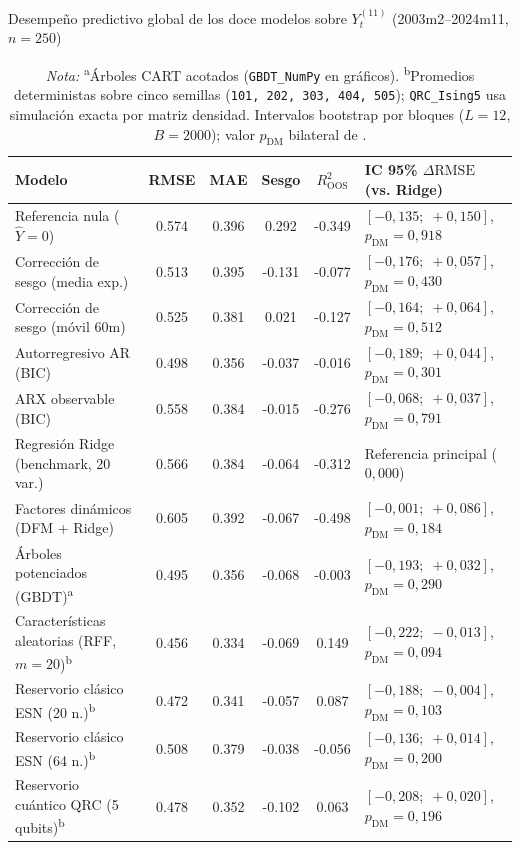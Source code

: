 \begin{table}[htbp]
	\centering
	\caption{Desempeño predictivo global de los doce modelos sobre \(Y_t^{(11)}\) (2003m2--2024m11, \(n=250\))}
	\label{tab:metricas}
	\footnotesize
	\renewcommand{\arraystretch}{1.15}
	\begin{tabular}{@{}>{\raggedright\arraybackslash}p{4.5cm}S[table-format=1.3]S[table-format=1.3]S[table-format=-1.3]S[table-format=-1.3]l@{}}
		\toprule
		Modelo & {RMSE} & {MAE} & {Sesgo} & {$R^2_{\text{OOS}}$} & {IC 95\% \(\Delta\text{RMSE}\) (vs. Ridge)}\\
		\midrule
		Referencia nula (\(\widehat{Y}=0\)) & 0.574 & 0.396 & 0.292 & -0.349 & {\([-0{,}135;\; +0{,}150]\), \(p_{\text{DM}}=0{,}918\)}\\
		Corrección de sesgo (media exp.) & 0.513 & 0.395 & -0.131 & -0.077 & {\([-0{,}176;\; +0{,}057]\), \(p_{\text{DM}}=0{,}430\)}\\
		Corrección de sesgo (móvil 60m) & 0.525 & 0.381 & 0.021 & -0.127 & {\([-0{,}164;\; +0{,}064]\), \(p_{\text{DM}}=0{,}512\)}\\
		Autorregresivo AR (BIC) & 0.498 & 0.356 & -0.037 & -0.016 & {\([-0{,}189;\; +0{,}044]\), \(p_{\text{DM}}=0{,}301\)}\\
		ARX observable (BIC) & 0.558 & 0.384 & -0.015 & -0.276 & {\([-0{,}068;\; +0{,}037]\), \(p_{\text{DM}}=0{,}791\)}\\
		Regresión Ridge (benchmark, 20 var.) & 0.566 & 0.384 & -0.064 & -0.312 & {Referencia principal (\(0{,}000\))}\\
		Factores dinámicos (DFM + Ridge) & 0.605 & 0.392 & -0.067 & -0.498 & {\([-0{,}001;\; +0{,}086]\), \(p_{\text{DM}}=0{,}184\)}\\
		Árboles potenciados (GBDT)\textsuperscript{a} & 0.495 & 0.356 & -0.068 & -0.003 & {\([-0{,}193;\; +0{,}032]\), \(p_{\text{DM}}=0{,}290\)}\\
		Características aleatorias (RFF, \(m=20\))\textsuperscript{b} & 0.456 & 0.334 & -0.069 & 0.149 & {\([-0{,}222;\; -0{,}013]\), \(p_{\text{DM}}=0{,}094\)}\\
		Reservorio clásico ESN (20 n.)\textsuperscript{b} & 0.472 & 0.341 & -0.057 & 0.087 & {\([-0{,}188;\; -0{,}004]\), \(p_{\text{DM}}=0{,}103\)}\\
		Reservorio clásico ESN (64 n.)\textsuperscript{b} & 0.508 & 0.379 & -0.038 & -0.056 & {\([-0{,}136;\; +0{,}014]\), \(p_{\text{DM}}=0{,}200\)}\\
		Reservorio cuántico QRC (5 qubits)\textsuperscript{b} & 0.478 & 0.352 & -0.102 & 0.063 & {\([-0{,}208;\; +0{,}020]\), \(p_{\text{DM}}=0{,}196\)}\\
		\bottomrule
	\end{tabular}
	\caption*{\footnotesize \textit{Nota:} \textsuperscript{a}Árboles CART acotados (\texttt{GBDT\_NumPy} en gráficos). \textsuperscript{b}Promedios deterministas sobre cinco semillas (\texttt{101, 202, 303, 404, 505}); \texttt{QRC\_Ising5} usa simulación exacta por matriz densidad. Intervalos bootstrap por bloques \parencite{politis1992} (\(L=12\), \(B=2000\)); valor \(p_{\text{DM}}\) bilateral de \textcite{harvey1997}.}
\end{table}

